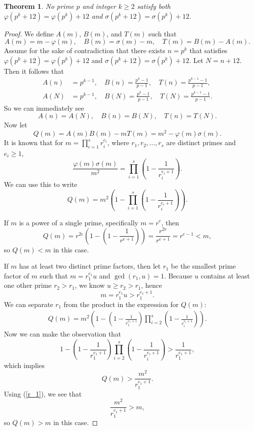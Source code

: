 \documentclass[12pt, twoside]{amsart}
\newtheorem{theorem}{Theorem}[section]
\theoremstyle{definition}
\begin{document}
\begin{theorem}\label{primepower}
    No prime $p$ and integer $k \ge 2$ satisfy both $\varphi(p^k+12) = \varphi(p^k)+12$ and $\sigma(p^k+12)=\sigma(p^k)+12$.
\end{theorem}

\begin{proof}
    We define $A(m)$, $B(m)$, and $T(m)$ such that
    \[A(m)=m-\varphi(m), \quad  B(m)=\sigma(m)-m, \quad T(m)=B(m)-A(m).\]
    Assume for the sake of contradiction that there exists $n=p^k$ that satisfies $\varphi(p^k+12) = \varphi(p^k)+12$ and $\sigma(p^k+12)=\sigma(p^k)+12$. Let $N=n+12$. Then it follows that
    \begin{align*}
        A(n)&=p^{k-1},   \quad
        B(n)=\frac{p^k-1}{p-1}, \quad
        T(n)=\frac{p^{k-1}-1}{p-1}, \\
        A(N)&=p^{k-1}, \quad
        B(N)=\frac{p^k-1}{p-1}, \quad
        T(N)=\frac{p^{k-1}-1}{p-1}.
    \end{align*}
    So we can immediately see
    \[
        A(n)=A(N), \quad B(n)=B(N), \quad T(n) = T(N).
    \]
    Now let
    \[Q(m)=A(m)B(m)-mT(m)=m^2-\varphi(m)\sigma(m).\]
    It is known that for $\displaystyle m=\prod_{i=1}^s r_i^{e_i}$, where $r_1,r_2,...,r_s$ are distinct primes and $e_i\ge1$,
    \[\frac{\varphi(m)\sigma(m)}{m^2}=\prod_{i=1}^s\left(1-\frac{1}{r_i^{e_i+1}}\right).\]
    We can use this to write
    \[Q(m)=m^2\left(1-\prod_{i=1}^s\left(1-\frac{1}{r_i^{e_i+1}}\right)\right).\]
    
    If $m$ is a power of a single prime, specifically $m=r^e$, then
    \[Q(m)=r^{2e}\left(1-\left(1-\frac{1}{r^{e+1}}\right)\right)=\frac{r^{2e}}{r^{e+1}}=r^{e-1}<m,\]
    so $Q(m)<m$ in this case.
    
    If $m$ has at least two distinct prime factors, then let $r_1$ be the smallest prime factor of $m$ such that $m=r_1^{e_1}u$ and $\gcd(r_1,u)=1$. Because $u$ contains at least one other prime $r_2>r_1$, we know $u\ge r_2 > r_1$, hence
    \begin{equation}\label{r_1}
        m=r_1^{e_1}u>r_1^{e_1+1}.
    \end{equation}
    We can separate $r_1$ from the product in the expression for $Q(m)$:
    \begin{align*}
        Q(m)=m^2\left(1-\left(1-\frac{1}{r_1^{e_1+1}}\right)\prod_{i=2}^s\left(1-\frac{1}{r_i^{e_i+1}}\right)\right).
    \end{align*}
    Now we can make the observation that
    \[1-\left(1-\frac{1}{r_1^{e_1+1}}\right)\prod_{i=2}^s\left(1-\frac{1}{r_i^{e_i+1}}\right)>\frac{1}{r_1^{e_1+1}},\]
    which implies
    \[Q(m)>\frac{m^2}{r_1^{e_1+1}}.\]
    Using (\ref{r_1}), we see that
    \[\frac{m^2}{r_1^{e_1+1}}>m,\]
    so $Q(m)>m$ in this case.
    

\end{proof}
\end{document}
